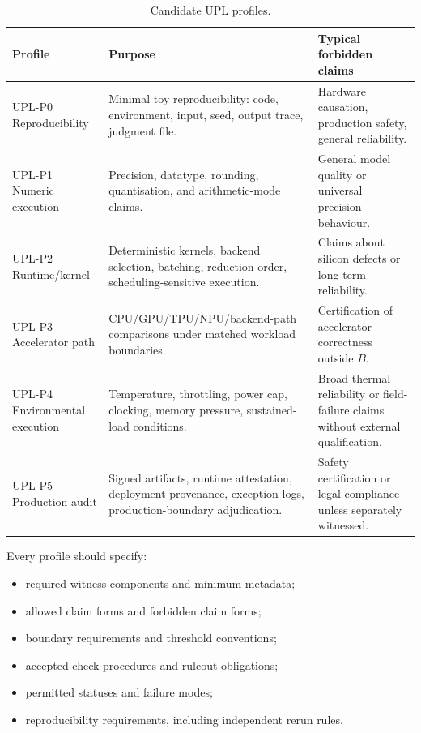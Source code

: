\documentclass[11pt, a4paper]{article}
\theoremstyle{upldef}
\begin{document}
\renewcommand{\arraystretch}{1.25}
\begin{table}[t]
\centering
\caption{Candidate UPL profiles.}
\label{tab:profiles}
\small
\begin{tabularx}{\textwidth}{l X X}
\toprule
\textbf{Profile} & \textbf{Purpose} & \textbf{Typical forbidden claims} \\
\midrule
UPL-P0 Reproducibility & Minimal toy reproducibility: code, environment, input, seed, output trace, judgment file. & Hardware causation, production safety, general reliability. \\
UPL-P1 Numeric execution & Precision, datatype, rounding, quantisation, and arithmetic-mode claims. & General model quality or universal precision behaviour. \\
UPL-P2 Runtime/kernel & Deterministic kernels, backend selection, batching, reduction order, scheduling-sensitive execution. & Claims about silicon defects or long-term reliability. \\
UPL-P3 Accelerator path & CPU/GPU/TPU/NPU/backend-path comparisons under matched workload boundaries. & Certification of accelerator correctness outside $B$. \\
UPL-P4 Environmental execution & Temperature, throttling, power cap, clocking, memory pressure, sustained-load conditions. & Broad thermal reliability or field-failure claims without external qualification. \\
UPL-P5 Production audit & Signed artifacts, runtime attestation, deployment provenance, exception logs, production-boundary adjudication. & Safety certification or legal compliance unless separately witnessed. \\
\bottomrule
\end{tabularx}
\end{table}

\noindent
Every profile should specify:
\begin{itemize}
\item required witness components and minimum metadata;
\item allowed claim forms and forbidden claim forms;
\item boundary requirements and threshold conventions;
\item accepted check procedures and ruleout obligations;
\item permitted statuses and failure modes;
\item reproducibility requirements, including independent rerun rules.
\end{itemize}
\end{document}
